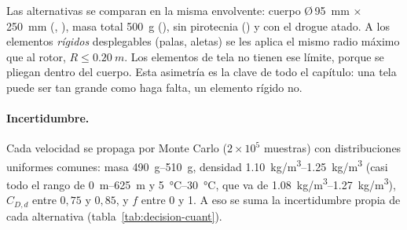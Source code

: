 Las alternativas se comparan en la misma envolvente: cuerpo Ø\,\SI{95}{mm} ×
\SI{250}{mm} (, ), masa total \SI{500}{g} (), sin pirotecnia
() y con el drogue atado. A los elementos \emph{rígidos} desplegables (palas,
aletas) se les aplica el mismo radio máximo que al rotor, $R\le\SI{0.20}{m}$. Los
elementos de tela no tienen ese límite, porque se pliegan dentro del cuerpo. Esta
asimetría es la clave de todo el capítulo: una tela puede ser tan grande como haga falta,
un elemento rígido no.

\paragraph{Incertidumbre.} Cada velocidad se propaga por Monte Carlo
($2\times10^5$ muestras) con distribuciones uniformes comunes: masa
\SIrange{490}{510}{g}, densidad \SIrange{1.10}{1.25}{kg/m^3} (casi todo el rango de \SIrange{0}{625}{m} y
\SIrange{5}{30}{\celsius}, que va de \SIrange{1.08}{1.27}{kg/m^3}), $C_{D,d}$ entre $0{,}75$ y $0{,}85$, y $f$ entre 0 y 1. A eso
se suma la incertidumbre propia de cada alternativa (tabla~\ref{tab:decision-cuant}).


